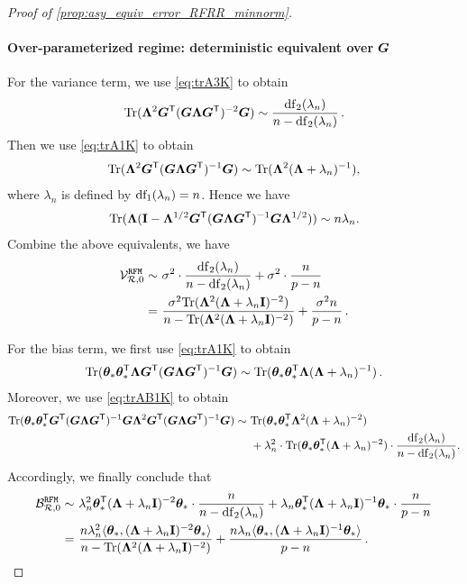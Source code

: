\begin{proof}[Proof of \cref{prop:asy_equiv_error_RFRR_minnorm}]
\paragraph{Over-parameterized regime: deterministic equivalent over $\bG$}
For the variance term, we use \cref{eq:trA3K} to obtain
\[
\begin{aligned}
\Tr(\bLambda^2 \bG^\sT (\bG \bLambda \bG^\sT)^{-2} \bG ) \sim \frac{{\rm df}_2(\lambda_n)}{n - {\rm df}_2(\lambda_n)}\,.
\end{aligned}
\]
Then we use \cref{eq:trA1K} to obtain
\[
\begin{aligned}
\Tr(\bLambda^2 \bG^\sT (\bG \bLambda \bG^\sT)^{-1} \bG ) \sim \Tr(\bLambda^2(\bLambda + \lambda_n)^{-1}),
\end{aligned}
\]
where $\lambda_n$ is defined by ${\rm df_1}(\lambda_n) = n$. Hence we have
\[
\begin{aligned}
\Tr(\bLambda ( \id - \bLambda^{1/2}\bG^\sT (\bG \bLambda \bG^\sT)^{-1} \bG \bLambda^{1/2} ) ) \sim n\lambda_n.
\end{aligned}
\]
Combine the above equivalents, we have
\[
\begin{aligned}
\mathcal{V}^{\tt RFM}_{\mathcal{R},0} \sim&~  \sigma^2 \cdot  \frac{{\rm df}_2(\lambda_n)}{n - {\rm df}_2(\lambda_n)} + \sigma^2 \cdot \frac{n}{p-n}\\
=&~ \frac{\sigma^2\Tr(\bLambda^2(\bLambda+\lambda_n\id)^{-2})}{n - \Tr(\bLambda^2(\bLambda+\lambda_n\id)^{-2})} + \frac{\sigma^2n}{p-n}\,.
\end{aligned}
\]

For the bias term, we first use \cref{eq:trA1K} to obtain
\[
\begin{aligned}
\Tr( \btheta_*\btheta_*^\sT \bLambda \bG^\sT ( \bG \bLambda \bG^\sT)^{-1} \bG) \sim \Tr(\btheta_*\btheta_*^\sT \bLambda (\bLambda + \lambda_n)^{-1})\,.
\end{aligned}
\]
Moreover, we use \cref{eq:trAB1K} to obtain
\[
\begin{aligned}
\Tr( \btheta_* \btheta_*^\sT \bG^\sT ( \bG \bLambda \bG^\sT )^{-1} \bG \bLambda^2 \bG^\sT ( \bG \bLambda \bG^\sT )^{-1} \bG) \sim&~ \Tr(\btheta_* \btheta_*^\sT \bLambda^2 ( \bLambda + \lambda_n )^{-2})\\ 
&~+ \lambda_n^2 \cdot \Tr(\btheta_* \btheta_*^\sT ( \bLambda + \lambda_n )^{-2}) \cdot \frac{{\rm df}_2(\lambda_n)}{n - {\rm df}_2(\lambda_n)}.
\end{aligned}
\]
Accordingly, we finally conclude that
\[
\begin{aligned}
\mathcal{B}^{\tt RFM}_{\mathcal{R},0} \sim&~ \lambda_n^2 \btheta_*^\sT ( \bLambda + \lambda_n \id)^{-2} \btheta_* \cdot \frac{n}{ n - {\rm df}_2(\lambda_n)} + \lambda_n \btheta_*^\sT ( \bLambda+ \lambda_n\id)^{-1} \btheta_* \cdot \frac{n}{p-n}\\
=&~ \frac{n\lambda_n^2 \<\btheta_*, ( \bLambda + \lambda_n \id)^{-2} \btheta_*\>}{ n - \Tr(\bLambda^2(\bLambda+\lambda_n\id)^{-2})} + \frac{n\lambda_n \<\btheta_*, ( \bLambda + \lambda_n\id)^{-1} \btheta_*\>}{p-n}\,.
\end{aligned}
\]
\end{proof}


